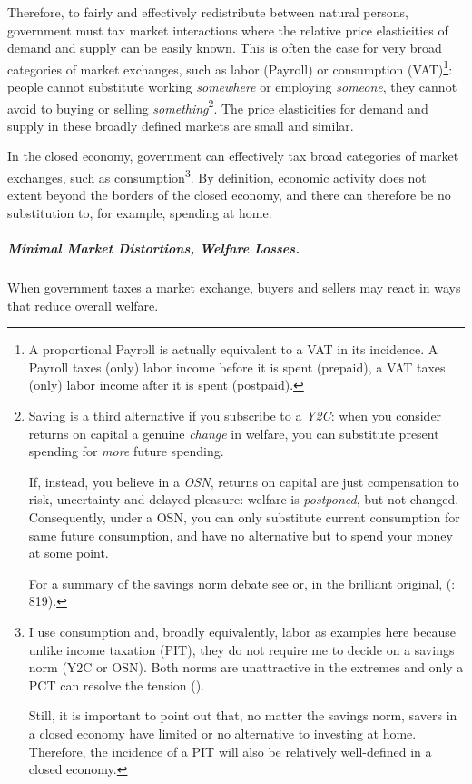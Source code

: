 Therefore, to fairly and effectively redistribute between natural persons, government must tax market interactions where the relative price elasticities of demand and supply can be easily known. This is often the case for very broad categories of market exchanges, such as labor (\gls{Payroll}) or consumption (\gls{VAT})\footnote{A proportional \gls{Payroll} is actually equivalent to a \gls{VAT} in its incidence. A \gls{Payroll} taxes (only) labor income before it is spent (prepaid), a \gls{VAT} taxes (only) labor income after it is spent (postpaid).}: people cannot substitute working \emph{somewhere} or employing \emph{someone}, they cannot avoid to buying or selling \emph{something}\footnote{
	Saving is a third alternative if you subscribe to a \emph{\gls{Y2C}}: when you consider returns on capital a genuine \emph{change} in welfare, you can substitute present spending for \emph{more} future spending. 
	
	If, instead, you believe in a \emph{\gls{OSN}}, returns on capital are just compensation to risk, uncertainty and delayed pleasure: welfare is \emph{postponed}, but not changed. Consequently, under a \gls{OSN}, you can only substitute current consumption for same future consumption, and have no alternative but to spend your money at some point. 
	
	For a summary of the savings norm debate see \cite{Held2010a} or, in the brilliant original, \citeauthor{McCaffery2005} (\citeyear{McCaffery2005}: 819).}. 
The price elasticities for demand and supply in these broadly defined markets are small and similar.

In the closed economy, government can effectively tax broad categories of market exchanges, such as consumption\footnote{
	I use consumption and, broadly equivalently, labor as examples here because unlike income taxation (\gls{PIT}), they do not require me to decide on a savings norm (\gls{Y2C} or \gls{OSN}). Both norms are unattractive in the extremes and only a \gls{PCT} can resolve the tension (\citealt{Held2010a}).
	
	Still, it is important to point out that, no matter the savings norm, savers in a closed economy have limited or no alternative to investing at home. Therefore, the incidence of a \gls{PIT} will also be relatively well-defined in a closed economy.}. 
By definition, economic activity does not extent beyond the borders of the closed economy, and there can therefore be no substitution to, for example, spending at home.

\subparagraph[Tax Efficiency]{Minimal Market Distortions, Welfare Losses.}  \label{sec:minimalDWL}
When government taxes a market exchange, buyers and sellers may react in ways that reduce overall welfare. 

